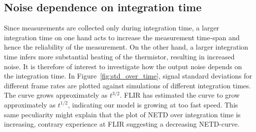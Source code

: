 \subsection{Noise dependence on integration time}
Since measurements are collected only during integration time, a larger integration time on one hand acts to increase the measurement time-span and hence the 
reliability of the measurement. On the other hand, a larger integration time infers more substantial heating of the thermistor, resulting in increased noise. It is therefore
of interest to investigate how the output noise depends on the integration time. In Figure~\ref{fig:std_over_time}, signal standard deviations for different frame rates 
are plotted against simulations of different integration times. The curve grows approximately as $t^{3/2}$. FLIR has estimated the curve to grow approximately as $t^{1/2}$, indicating
our model is growing at too fast speed. This same peculiarity might explain that the plot of NETD over integration time is increasing, contrary experience at FLIR suggesting
a decreasing NETD-curve. 
